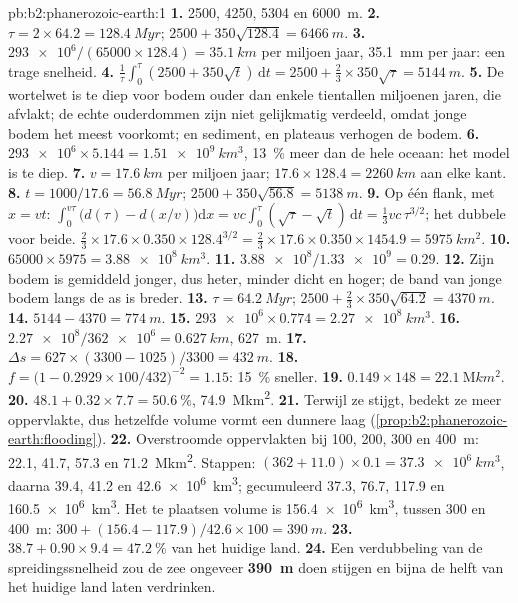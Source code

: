 \begin{solution}{pb:b2:phanerozoic-earth:1}
\textbf{1.} 2500, 4250, 5304 en \qty{6000}{m}.
\textbf{2.} $\tau = 2 \times 64.2 = \qty{128.4}{Myr}$; $2500 + 350\sqrt{128.4} = \qty{6466}{m}$.
\textbf{3.} $\num{293e6}/(65000 \times 128.4) = \qty{35.1}{km}$ per miljoen jaar,
\qty{35.1}{mm} per jaar: een trage snelheid.
\textbf{4.} $\frac1\tau\int_0^\tau(2500 + 350\sqrt t)\,\mathrm{d}t = 2500 + \frac23 \times
350\sqrt\tau = \qty{5144}{m}$.
\textbf{5.} De wortelwet is te diep voor bodem ouder dan enkele tientallen miljoenen jaren,
die afvlakt; de echte ouderdommen zijn niet gelijkmatig verdeeld, omdat jonge bodem het meest voorkomt; en
sediment,  en plateaus verhogen de bodem.
\textbf{6.} $\num{293e6} \times 5.144 = \qty{1.51e9}{km^3}$, \qty{13}{\percent} meer dan de
hele oceaan: het model is te diep.
\textbf{7.} $v = \qty{17.6}{km}$ per miljoen jaar; $17.6 \times 128.4 = \qty{2260}{km}$ aan
elke kant.
\textbf{8.} $t = 1000/17.6 = \qty{56.8}{Myr}$; $2500 + 350\sqrt{56.8} = \qty{5138}{m}$.
\textbf{9.} Op één flank, met $x = vt$: $\int_0^{v\tau}\bigl(d(\tau) - d(x/v)\bigr)\mathrm{d}x
= vc\int_0^\tau(\sqrt\tau - \sqrt t)\,\mathrm{d}t = \frac13 vc\,\tau^{3/2}$; het dubbele voor beide.
$\frac23 \times 17.6 \times 0.350 \times 128.4^{3/2} = \frac23 \times 17.6 \times 0.350 \times
1454.9 = \qty{5975}{km^2}$.
\textbf{10.} $65000 \times 5975 = \qty{3.88e8}{km^3}$.
\textbf{11.} $\num{3.88e8}/\num{1.33e9} = 0.29$.
\textbf{12.} Zijn bodem is gemiddeld jonger, dus heter, minder dicht en hoger; de band van jonge
bodem langs de as is breder.
\textbf{13.} $\tau = \qty{64.2}{Myr}$; $2500 + \frac23 \times 350\sqrt{64.2} = \qty{4370}{m}$.
\textbf{14.} $5144 - 4370 = \qty{774}{m}$.
\textbf{15.} $\num{293e6} \times 0.774 = \qty{2.27e8}{km^3}$.
\textbf{16.} $\num{2.27e8}/\num{362e6} = \qty{0.627}{km}$, \qty{627}{m}.
\textbf{17.} $\Delta s = 627 \times (3300 - 1025)/3300 = \qty{432}{m}$.
\textbf{18.} $f = \bigl(1 - 0.2929 \times 100/432\bigr)^{-2} = 1.15$: \qty{15}{\percent} sneller.
\textbf{19.} $0.149 \times 148 = \qty{22.1}{\mega km^2}$.
\textbf{20.} $48.1 + 0.32 \times 7.7 = \qty{50.6}{\percent}$, \qty{74.9}{\mega km^2}.
\textbf{21.} Terwijl ze stijgt, bedekt ze meer oppervlakte, dus hetzelfde volume vormt een dunnere laag
(\cref{prop:b2:phanerozoic-earth:flooding}).
\textbf{22.} Overstroomde oppervlakten bij 100, 200, 300 en \qty{400}{m}: 22.1, 41.7, 57.3 en
\qty{71.2}{\mega km^2}. Stappen: $(362 + 11.0) \times 0.1 = \qty{37.3e6}{km^3}$, daarna 39.4, 41.2
en \qty{42.6e6}{km^3}; gecumuleerd 37.3, 76.7, 117.9 en \qty{160.5e6}{km^3}. Het te plaatsen volume
is \qty{156.4e6}{km^3}, tussen 300 en \qty{400}{m}: $300 + (156.4 - 117.9)/42.6 \times 100
= \qty{390}{m}$.
\textbf{23.} $38.7 + 0.90 \times 9.4 = \qty{47.2}{\percent}$ van het huidige land.
\textbf{24.} Een verdubbeling van de spreidingssnelheid zou de zee ongeveer \textbf{\qty{390}{m}} doen stijgen en
bijna de helft van het huidige land laten verdrinken.
\end{solution}
